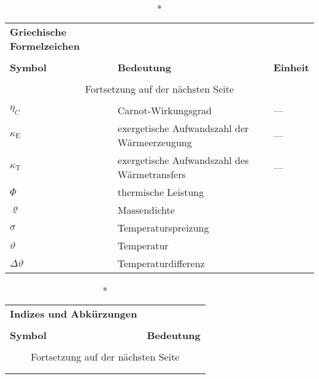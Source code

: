 \begin{onehalfspacing}
\begin{longtable}[h]{p{} p{} p{}}
		\caption*{\textbf{Griechische Formelzeichen}} \\
		\\
		\textbf{Symbol} & \textbf{Bedeutung} & \textbf{Einheit} \\ %
		\endhead
		\\
		\multicolumn{3}{c}{Fortsetzung auf der nächsten Seite} \\
		\endfoot
		\multicolumn{3}{c}{ } \\
		\endlastfoot
		
		$\eta_{C}$ & Carnot-Wirkungsgrad & ---\\
		$\kappa_{\mathrm{E}}$ & exergetische Aufwandszahl der Wärmeerzeugung & ---\\
		$\kappa_{\mathrm{T}}$ & exergetische Aufwandszahl des Wärmetransfers & ---\\
		$\Phi$ & thermische Leistung & \watt\\
		$\varrho$& Massendichte&\kilogrampercubicmetre\\
			$\sigma$&Temperaturspreizung&\kelvin\\
		$\vartheta $ & Temperatur  & \degreecelsius\\
		$\Delta\vartheta $ & Temperaturdifferenz  &\kelvin\\
		
\end{longtable}

\begin{longtable}[h]{p{} p{}}
		\caption*{\textbf{Indizes und Abkürzungen}} \\
		\\
		\textbf{Symbol} & \textbf{Bedeutung} \\ %
		\endhead
		\\
		\multicolumn{2}{c}{Fortsetzung auf der nächsten Seite} \\
		\endfoot
		\multicolumn{2}{c}{ } \\
		\endlastfoot
		

\end{longtable}
\end{onehalfspacing}
